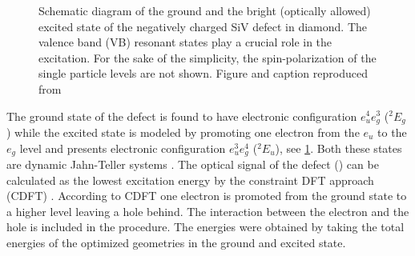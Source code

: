 	\begin{figure}[!htb]
		\centering
		\caption[Schematic diagram of the ground and excited state of the \siv]{Schematic diagram of the ground and the bright (optically allowed) excited state of the negatively charged SiV defect in diamond. The valence band (VB) resonant states play a crucial role in the excitation. For the sake of the simplicity, the spin-polarization of the single particle levels are not shown. Figure and caption reproduced from \cite{Gali2013}}
		\label{fig::ground_excited_state}
	\end{figure}

	The ground state of the defect is found to have electronic configuration $e^{4}_{u} e^{3}_{g}$ (${}^{2}E_{g}$) while the excited state is modeled by promoting one electron from the $e_u$ to the $e_g$ level and presents electronic configuration  $e^{3}_{u} e^{4}_{g}$ (${}^{2}E_{u}$), see \ref{fig::ground_excited_state}. Both these states are dynamic Jahn-Teller systems \cite{Hepp2014, Rogers2014a}. The optical signal of the defect (\ZPL) can be calculated as the lowest excitation energy by the constraint DFT approach (CDFT) \cite{gali2009theory}. According to CDFT one electron is promoted from the ground state to a higher level leaving a hole behind. The interaction between the electron and the hole is included in the procedure. The \ZPL energies were obtained by taking the total energies of the optimized geometries in the ground and excited state.

